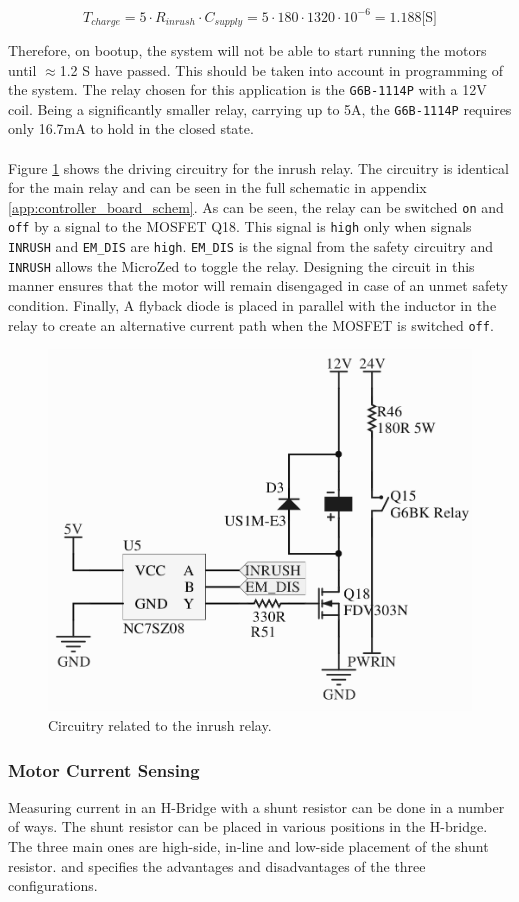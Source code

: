\begin{equation}
	T_{charge} = 5\cdot R_{inrush}\cdot C_{supply} = 5\cdot 180\cdot 1320\cdot10^{-6} = 1.188 \text{[S]}
\end{equation}

Therefore, on bootup, the system will not be able to start running the motors until $\approx$1.2 S have passed.
This should be taken into account in programming of the system.
The relay chosen for this application is the \texttt{G6B-1114P} \cite{g6b} with a 12V coil.
Being a significantly smaller relay, carrying up to 5A, the \texttt{G6B-1114P} requires only 16.7mA to hold in the closed state.\\~\\
Figure \ref{fig:relaycircuit} shows the driving circuitry for the inrush relay. 
The circuitry is identical for the main relay and can be seen in the full schematic in appendix \ref{app:controller_board_schem}.
As can be seen, the relay can be switched \texttt{on} and \texttt{off} by a signal to the MOSFET Q18.
This signal is \texttt{high} only when signals \texttt{INRUSH} and \texttt{EM\_DIS} are \texttt{high}.
\texttt{EM\_DIS} is the signal from the safety circuitry and \texttt{INRUSH} allows the MicroZed to toggle the relay.
Designing the circuit in this manner ensures that the motor will remain disengaged in case of an unmet safety condition.
Finally, A flyback diode is placed in parallel with the inductor in the relay to create an alternative current path when the MOSFET is switched \texttt{off}.

\begin{figure}[H]
	\centering
	\includegraphics[width=.5\linewidth]{graphics/relay_circuit}
	\caption{Circuitry related to the inrush relay.}
	\label{fig:relaycircuit}
\end{figure}


\subsubsection{Motor Current Sensing}
Measuring current in an H-Bridge with a shunt resistor can be done in a number of ways.
The shunt resistor can be placed in various positions in the H-bridge.
The three main ones are high-side, in-line and low-side placement of the shunt resistor.
\cite{shunt_placement} and \cite{Current_Sense_Circuit_Collection} specifies the advantages and disadvantages of the three configurations.

